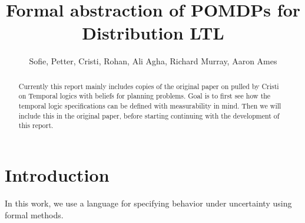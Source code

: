 \documentclass[conference]{IEEEtran}
\begin{document}

\title{\huge Formal abstraction of POMDPs for Distribution LTL}

\author{Sofie, Petter, Cristi, Rohan, Ali Agha, Richard Murray, Aaron Ames}

\maketitle

\begin{abstract}
Currently this report mainly includes copies of the  original paper on pulled by Cristi on Temporal logics with beliefs for planning problems.  Goal is to first see how the temporal logic specifications can be defined with measurability in mind. Then we will include this in the original paper, before starting continuing with the development of this report. 
\end{abstract}

\IEEEpeerreviewmaketitle

	
 
\section{Introduction} \label{subsec:intro}
In this work, we use a language for specifying behavior under uncertainty using formal methods. 
\end{document}
